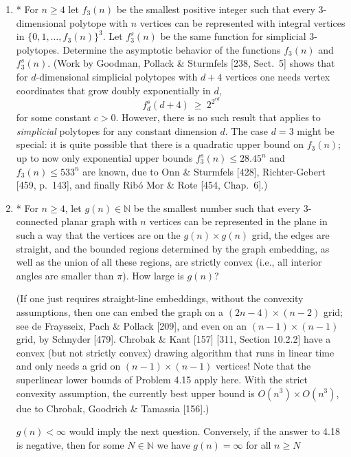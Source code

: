 \documentclass{article}
\begin{document}
\begin{enumerate}
\begin{solution}
\end{solution}

\item* For $n\ge 4$ let $f_3(n)$ be the smallest positive integer such that every $3$-dimensional polytope with $n$ vertices can be represented with integral vertices in $\{0,1,\ldots,f_3(n)\}^3$. Let $f_3^s(n)$ be the same function for simplicial $3$-polytopes. Determine the asymptotic behavior of the functions $f_3(n)$ and $f_3^s(n)$. (Work by Goodman, Pollack \& Sturmfels [238, Sect.\ 5] shows that for $d$-dimensional simplicial polytopes with $d+4$ vertices one needs vertex coordinates that grow doubly exponentially in $d$, \[
f_d^s(d+4)\ \ge\ 2^{2^{cd}}
\] for some constant $c>0$. However, there is no such result that applies to \emph{simplicial} polytopes for any constant dimension $d$. The case $d=3$ might be special: it is quite possible that there is a quadratic upper bound on $f_3(n)$; up to now only exponential upper bounds $f_3^s(n)\le 28.45^n$ and $f_3(n)\le 533^n$ are known, due to Onn \& Sturmfels [428], Richter-Gebert [459, p.\ 143], and finally Rib\'o Mor \& Rote [454, Chap.\ 6].)

\item* For $n\ge 4$, let $g(n)\in\mathbb{N}$ be the smallest number such that every $3$-connected planar graph with $n$ vertices can be represented in the plane in such a way that the vertices are on the $g(n)\times g(n)$ grid, the edges are straight, and the bounded regions determined by the graph embedding, as well as the union of all these regions, are strictly convex (i.e., all interior angles are smaller than $\pi$). How large is $g(n)$? 

(If one just requires straight-line embeddings, without the convexity assumptions, then one can embed the graph on a $(2n-4)\times(n-2)$ grid; see de Fraysseix, Pach \& Pollack [209], and even on an $(n-1)\times(n-1)$ grid, by Schnyder [479]. Chrobak \& Kant [157] [311, Section 10.2.2] have a convex (but not strictly convex) drawing algorithm that runs in linear time and only needs a grid on $(n-1)\times(n-1)$ vertices! Note that the superlinear lower bounds of Problem 4.15 apply here. With the strict convexity assumption, the currently best upper bound is $O(n^3)\times O(n^3)$, due to Chrobak, Goodrich \& Tamassia [156].)

\begin{remark}
    $g(n) < \infty$ would imply the next question. Conversely, if the answer to 4.18 is negative, then for some $N \in \mathbb{N}$ we have $g(n) = \infty$ for all $n \geq N$
\end{remark}
    

\end{enumerate}
\end{document}
